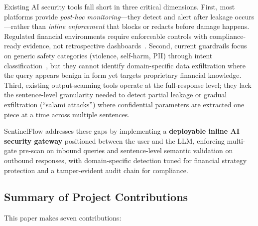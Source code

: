\documentclass[journal]{IEEEtran}
\begin{document}
Existing AI security tools fall short in three critical dimensions. First, most platforms provide \textit{post-hoc monitoring}---they detect and alert after leakage occurs---rather than \textit{inline enforcement} that blocks or redacts before damage happens. Regulated financial environments require enforceable controls with compliance-ready evidence, not retrospective dashboards~\cite{nist_ai_rmf, nist_ai_600_1}. Second, current guardrails focus on generic safety categories (violence, self-harm, PII) through intent classification~\cite{llama_guard, ms_prompt_shields}, but they cannot identify domain-specific data exfiltration where the query appears benign in form yet targets proprietary financial knowledge. Third, existing output-scanning tools operate at the full-response level; they lack the sentence-level granularity needed to detect partial leakage or gradual exfiltration (``salami attacks'') where confidential parameters are extracted one piece at a time across multiple sentences.

SentinelFlow addresses these gaps by implementing a \textbf{deployable inline AI security gateway} positioned between the user and the LLM, enforcing multi-gate pre-scan on inbound queries and sentence-level semantic validation on outbound responses, with domain-specific detection tuned for financial strategy protection and a tamper-evident audit chain for compliance.

\subsection{Summary of Project Contributions}
This paper makes seven contributions:
\end{document}
